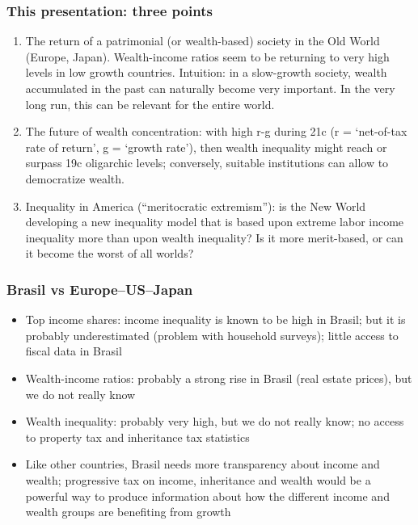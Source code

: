\documentclass[t]{beamer}\usepackage[]{graphicx}\usepackage[]{color}
\begin{document}
\begin{frame}[label=ThreePoints,fragile]
\frametitle{This presentation: three points}
\begin{enumerate}
\item
The return of a patrimonial (or wealth-based) society in the Old World (Europe, Japan). Wealth-income ratios seem to be returning to very high levels in low growth countries.
\medskip\newline
Intuition: in a slow-growth society, wealth accumulated in the past can naturally become very important. In the very long run, this can be relevant for the entire world.
\item 
The future of wealth concentration: with high r-g during 21c (r = `net-of-tax rate of return', g = `growth rate'), then wealth inequality might reach or surpass 19c oligarchic levels; conversely, suitable institutions can allow to democratize wealth.
\item
Inequality in America (``meritocratic extremism''): is the New World developing a new inequality model that is based upon extreme labor income inequality more than upon wealth inequality? Is it more merit-based, or can it become the worst of all worlds?
\end{enumerate}
\end{frame}


\begin{frame}[label=BrasilVersus]
\frametitle{Brasil vs Europe--US--Japan}
\begin{itemize}
\item
Top income shares: income inequality is known to be high in Brasil; but it is probably underestimated (problem with household surveys); little access to fiscal data in Brasil
\item 
Wealth-income ratios: probably a strong rise in Brasil (real estate prices), but we do not really know
\item
Wealth inequality: probably very high, but we do not really know; no access to property tax and inheritance tax statistics
\item
Like other countries, Brasil needs more transparency about income and wealth; progressive tax on income, inheritance and wealth would be a powerful way to produce information about how the different income and wealth groups are benefiting from growth
\end{itemize}
\end{frame}
\end{document}
